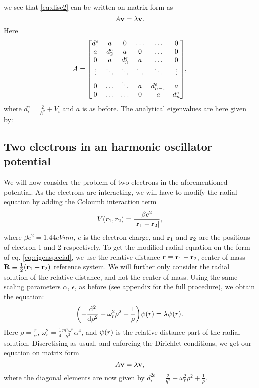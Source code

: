 we see that \ref{eq:disc2} can be written on matrix form as
  \begin{equation}
    A\vb{v} = \lambda \vb{v}.
  \end{equation}
Here
  \begin{equation}
    A =
      \mqty[d_1^e & a & 0 & \hdots & \hdots & 0 \\
            a & d_2^e & a & 0 & \hdots & 0 \\
            0 & a & d_3^e & a & \hdots & 0 \\
            \vdots & \ddots & \ddots & \ddots & \ddots & \vdots \\
            0 & \hdots & \ddots & a & d_{n-1}^e & a \\
            0 & \hdots & \hdots & 0 & a & d_n^e],
  \end{equation}
where $d_i^e = \frac{2}{h^2} + V_i$ and $a$ is as before. The analytical eigenvalues
are here given by:

\subsection{Two electrons in an harmonic oscillator potential}
\label{sec:qmdots}

We will now consider the problem of two electrons in the aforementioned potential.
As the electrons are interacting, we will have to modify the radial equation by adding the Coloumb interaction term
  \begin{equation}
    V\qty(r_1, r_2) = \frac{\beta e^2}{\abs{\vb{r}_1 - \vb{r}_2}},
  \end{equation}
where $\beta e^2 = 1.44 eVnm$, $e$ is the electron charge, and $\vb{r}_1$ and $\vb{r}_2$ are the
positions of electron 1 and 2 respectively.
To get the modified radial equation on the form of eq. \ref{eq:eigenspecial}, we use the relative distance
$\vb{r} \equiv \vb{r}_1 - \vb{r}_2$, center of mass $\vb{R} \equiv \frac{1}{2}\qty(\vb{r}_1 + \vb{r}_2)$
reference system. We will further only consider the radial solution of the relative distance, and not the center of mass.
Using the same scaling parameters $\alpha$, $\epsilon$, as before
(see appendix for the full procedure), we obtain the equation:
  \begin{equation}
    \qty(-\dv[2]{}{\rho} + \omega_r^2\rho^2 + \frac{1}{\rho})\psi\qty(r) = \lambda \psi\qty(r).
  \end{equation}
Here $\rho = \frac{r}{\alpha}$, $\omega_r^2 = \frac{1}{4}\frac{m^2\omega^2}{\hbar^2}\alpha^4$, and
$\psi\qty(r)$ is the relative distance part of the radial solution. Discretising
as usual, and enforcing the Dirichlet conditions, we get our equation on matrix form
  \[A\vb{v} = \lambda \vb{v},
  \]
where the diagonal elements are now given by $d_{i}^{2e} = \frac{2}{h^2} + \omega_r^2 \rho^2 + \frac{1}{\rho}$.

